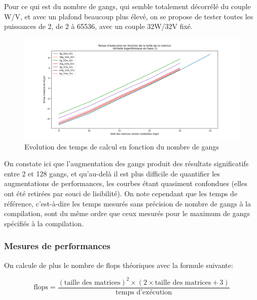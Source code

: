 \documentclass{article}
\begin{document}
Pour ce qui est du nombre de gangs, qui semble totalement décorrélé du couple W/V, et avec un plafond beaucoup plus élevé, on se propose de tester toutes les puissances de 2, de 2 à 65536, avec un couple 32W/32V fixé.

\begin{figure}[!htb]
	\centering
	\includegraphics[width=\textwidth]{Gang_Log2.png}
	\caption{Evolution des temps de calcul en fonction du nombre de gangs}
\end{figure}

On constate ici que l'augmentation des gangs produit des résultats significatifs entre 2 et 128 gangs, et qu'au-delà il est plus difficile de quantifier les augmentations de performances, les courbes étant quasiment confondues (elles ont été retirées par souci de lisibilité). On note cependant que les temps de référence, c'est-à-dire les temps mesurés sans précision de nombre de gangs à la compilation, sont du même ordre que ceux mesurés pour le maximum de gangs spécifiés à la compilation.

\subsubsection{Mesures de performances}

On calcule de plus le nombre de \gls{flops} théoriques avec la formule suivante:

$$\mbox{flops} = \frac{(\mbox{taille des matrices})^2 \times (2 \times \mbox{taille des matrices} + 3)}{\mbox{temps d'exécution}}$$
\end{document}
